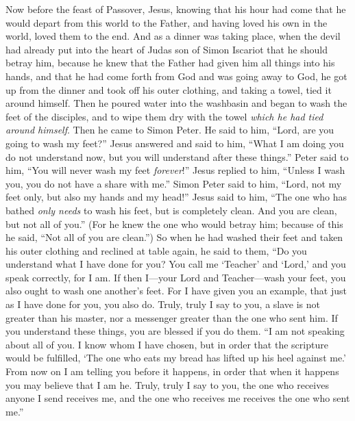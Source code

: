 \begin{biblechapter} %
 Now before the feast of Passover, Jesus, knowing that his hour had come that he would depart from this world to the Father, and having loved his own in the world, loved them to the end.
\verse And as a dinner was taking place, when the devil had already put into the heart of Judas son of Simon Iscariot that he should betray him,
\verse because he knew that the Father had given him all things into his hands, and that he had come forth from God and was going away to God,
\verse he got up from the dinner and took off his outer clothing, and taking a towel, tied it around himself.
\verse Then he poured water into the washbasin and began to wash the feet of the disciples, and to wipe them dry with the towel \textit{which he had tied around himself}.
\verse Then he came to Simon Peter. He said to him, “Lord, are you going to wash my feet?”
\verse Jesus answered and said to him, “What I am doing you do not understand now, but you will understand after these things.”
\verse Peter said to him, “You will never wash my feet \textit{forever}!” Jesus replied to him, “Unless I wash you, you do not have a share with me.”
\verse Simon Peter said to him, “Lord, not my feet only, but also my hands and my head!”
\verse Jesus said to him, “The one who has bathed \textit{only needs} to wash his feet, but is completely clean. And you are clean, but not all of you.”
\verse (For he knew the one who would betray him; because of this he said, “Not all of you are clean.”)
\verse So when he had washed their feet and taken his outer clothing and reclined at table again, he said to them, “Do you understand what I have done for you?
\verse You call me ‘Teacher’ and ‘Lord,’ and you speak correctly, for I am.
\verse If then I—your Lord and Teacher—wash your feet, you also ought to wash one another’s feet.
\verse For I have given you an example, that just as I have done for you, you also do.
\verse Truly, truly I say to you, a slave is not greater than his master, nor a messenger greater than the one who sent him.
\verse If you understand these things, you are blessed if you do them.
\verse “I am not speaking about all of you. I know whom I have chosen, but in order that the scripture would be fulfilled, ‘The one who eats my bread has lifted up his heel against me.’
\verse From now on I am telling you before it happens, in order that when it happens you may believe that I am he.
\verse Truly, truly I say to you, the one who receives anyone I send receives me, and the one who receives me receives the one who sent me.”

\end{biblechapter}

